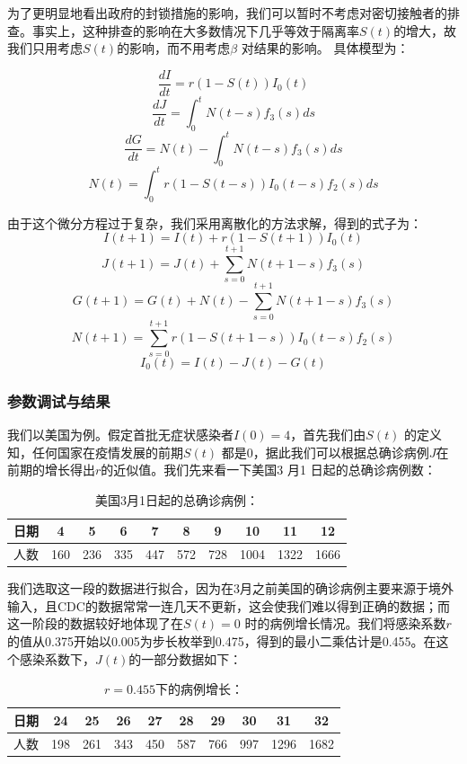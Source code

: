 \documentclass[UTF8]{ctexart}
\begin{document}
				\indent 为了更明显地看出政府的封锁措施的影响，我们可以暂时不考虑对密切接触者的排查。事实上，这种排查的影响在大多数情况下几乎等效于隔离率$S(t)$的增大，故我们只用考虑$S(t)$的影响，而不用考虑$\beta$ 对结果的影响。
				具体模型为：
				
				$$\frac{dI}{dt}=r(1-S(t))I_0(t)$$
				$$\frac{dJ}{dt}=\int_0^t N(t-s)f_3(s) ds $$
				$$\frac{dG}{dt}=N(t)-\int_0^t N(t-s)f_3(s) ds $$
				$$N(t)=\int_0^t r(1-S(t-s))I_0(t-s) f_2(s) ds$$
				
				由于这个微分方程过于复杂，我们采用离散化的方法求解，得到的式子为：
				$$I(t+1)=I(t)+r(1-S(t+1))I_0(t)$$
				$$J(t+1)=J(t)+\sum_{s=0}^{t+1} N(t+1-s)f_3(s) $$
				$$G(t+1)=G(t)+N(t)-\sum_{s=0}^{t+1}N(t+1-s)f_3(s)$$
				$$N(t+1)=\sum_{s=0}^{t+1}r(1-S(t+1-s))I_0(t-s)f_2(s)$$
				$$I_0(t)=I(t)-J(t)-G(t)$$
	
			\subsubsection{参数调试与结果}
				我们以美国为例。假定首批无症状感染者$I(0)=4$，首先我们由$S(t)$ 的定义知，任何国家在疫情发展的前期$S(t)$ 都是0，据此我们可以根据总确诊病例$J$在前期的增长得出$r$的近似值。我们先来看一下美国3 月1 日起的总确诊病例数：
			\begin{table}[H]
				\centering
				\caption{美国3月1日起的总确诊病例：}
				\begin{tabular}{|c|c|c|c|c|c|c|c|c|c|}
					\hline
					日期&4&5&6&7&8&9&10&11&12\\ \hline
					人数&160&236&335&447&572&728&1004&1322&1666\\
					\hline
				\end{tabular}
			\end{table}
			
			我们选取这一段的数据进行拟合，因为在3月之前美国的确诊病例主要来源于境外输入，且CDC的数据常常一连几天不更新，这会使我们难以得到正确的数据；而这一阶段的数据较好地体现了在$S(t)=0$ 时的病例增长情况。我们将感染系数$r$的值从0.375开始以0.005为步长枚举到0.475，得到的最小二乘估计是0.455。在这个感染系数下，$J(t)$的一部分数据如下：
			\begin{table}[H]
				\centering
				\caption{$r=0.455$下的病例增长：}
				\begin{tabular}{|c|c|c|c|c|c|c|c|c|c|}
					\hline
					日期&24&25&26&27&28&29&30&31&32\\ \hline
					人数&198&261&343&450&587&766&997&1296&1682\\
					\hline
				\end{tabular}
			\end{table}
			
\end{document}
